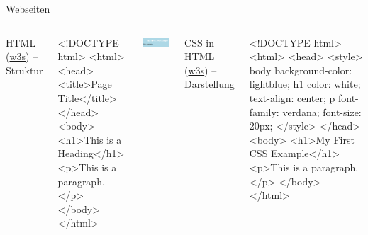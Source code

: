 \begin{frame}[fragile]{Webseiten}
  \begin{columns}[T,onlytextwidth]
    HTML (\href{https://www.w3schools.com/html/default.asp}{w3s}) -- Struktur
\begin{htmlcode}
<!DOCTYPE html>
<html>
 <head>
   <title>Page Title</title>
 </head>
 <body>
  <h1>This is a Heading</h1>
  <p>This is a paragraph.</p>
 </body>
</html>
\end{htmlcode}

      
      \begin{block}{}
        \includegraphics[width=0.97\textwidth]{img/css-example.png}
      \end{block}



CSS in HTML (\href{https://www.w3schools.com/css/default.asp}{w3s}) -- Darstellung
\begin{htmlcode}
<!DOCTYPE html>
<html>
  <head>
    <style>
body {
  background-color: lightblue;
}
h1 {
  color: white;
  text-align: center;
}
p {
  font-family: verdana;
  font-size: 20px;
}
    </style>
  </head>
  <body>
    <h1>My First CSS Example</h1>
    <p>This is a paragraph.</p>
  </body>
</html>
\end{htmlcode}

  \end{columns}
\end{frame}


